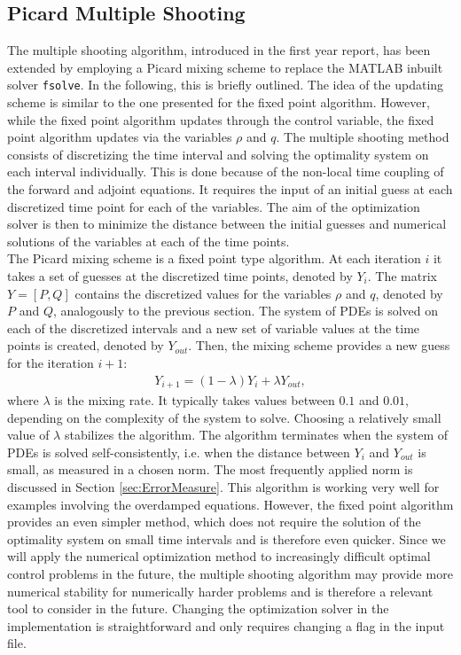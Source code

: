 \documentclass[11pt, a4paper]{article}
\theoremstyle{definition}
\begin{document}
\subsection{Picard Multiple Shooting}

The multiple shooting algorithm, introduced in the first year report, has been extended by employing a Picard mixing scheme to replace the {\scshape MATLAB} inbuilt solver \texttt{fsolve}. In the following, this is briefly outlined.
The idea of the updating scheme is similar to the one presented for the fixed point algorithm. However, while the fixed point algorithm updates through the control variable, the fixed point algorithm updates via the variables $\rho$ and $q$.
The multiple shooting method consists of discretizing the time interval and solving the optimality system on each interval individually. This is done because of the non-local time coupling of the forward and adjoint equations. It requires the input of an initial guess at each discretized time point for each of the variables. The aim of the optimization solver is then to minimize the distance between the initial guesses and numerical solutions of the variables at each of the time points. \\
The Picard mixing scheme is a fixed point type algorithm. At each iteration $i$ it takes a set of guesses at the discretized time points, denoted by $Y_i$. The matrix $Y = [P,Q]$ contains the discretized values for the variables $\rho$ and $q$, denoted by $P$ and $Q$, analogously to the previous section.  
The system of PDEs is solved on each of the discretized intervals and a new set of variable values at the time points is created, denoted by $Y_{out}$. Then, the mixing scheme provides a new guess for the iteration $i+1$:
\begin{align*}
Y_{i+1} = (1 - \lambda)Y_i + \lambda Y_{out},
\end{align*}
where $\lambda$ is the mixing rate. It typically takes values between $0.1$ and $0.01$, depending on the complexity of the system to solve. Choosing a relatively small value of $\lambda$ stabilizes the algorithm. 
The algorithm terminates when the system of PDEs is solved self-consistently, i.e. when the distance between $Y_i$ and $Y_{out}$ is small, as measured in a chosen norm. The most frequently applied norm is discussed in Section \ref{sec:ErrorMeasure}.
This algorithm is working very well for examples involving the overdamped equations. However, the fixed point algorithm provides an even simpler method, which does not require the solution of the optimality system on small time intervals and is therefore even quicker. Since we will apply the numerical optimization method to increasingly difficult optimal control problems in the future, the multiple shooting algorithm may provide more numerical stability for numerically harder problems and is therefore a relevant tool to consider in the future. Changing the optimization solver in the implementation is straightforward and only requires changing a flag in the input file.
\end{document}
